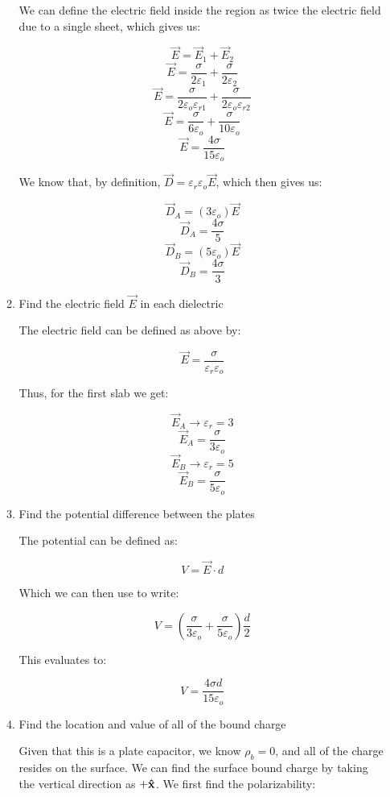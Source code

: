 \begin{enumerate}
\begin{enumerate}
        We can define the electric field inside the region as twice the electric field due to a single sheet, which gives us:

        $$\vec{E}=\vec{E}_1+\vec{E}_2$$
        $$\vec{E}=\frac{\sigma}{2\varepsilon_1}+\frac{\sigma}{2\varepsilon_2}$$
        $$\vec{E}=\frac{\sigma}{2\varepsilon_o\varepsilon_{r1}}+\frac{\sigma}{2\varepsilon_o\varepsilon_{r2}}$$
        $$\vec{E}=\frac{\sigma}{6\varepsilon_o}+\frac{\sigma}{10\varepsilon_o}$$
        $$\vec{E}=\frac{4\sigma}{15\varepsilon_o}$$

        We know that, by definition, $\vec{D}=\varepsilon_r\varepsilon_o\vec{E}$, which then gives us:

        $$\vec{D}_A=(3\varepsilon_o)\vec{E}$$
        $$\boxed{\vec{D}_A=\frac{4\sigma}{5}}$$
        $$\vec{D}_B=(5\varepsilon_o)\vec{E}$$
        $$\boxed{\vec{D}_B=\frac{4\sigma}{3}}$$

      \item Find the electric field $\vec{E}$ in each dielectric

        The electric field can be defined as above by:

        $$\vec{E}=\frac{\sigma}{\varepsilon_r\varepsilon_o}$$

        Thus, for the first slab we get:

        $$\vec{E}_A\to\varepsilon_r=3$$
        $$\boxed{\vec{E}_A=\frac{\sigma}{3\varepsilon_o}}$$
        $$\vec{E}_B\to\varepsilon_r=5$$
        $$\boxed{\vec{E}_B=\frac{\sigma}{5\varepsilon_o}}$$

      \item Find the potential difference between the plates

        The potential can be defined as:

        $$V=\vec{E}\cdot d$$

        Which we can then use to write:

        $$V=\left( \frac{\sigma}{3\varepsilon_o} +\frac{\sigma}{5\varepsilon_o}\right)\frac{d}{2}$$

        This evaluates to:

        $$\boxed{V=\frac{4\sigma d}{15\varepsilon_o}}$$

      \item Find the location and value of all of the bound charge

        Given that this is a plate capacitor, we know $\rho_b=0$, and all of the charge resides on the surface. We can find the surface bound charge by taking the vertical direction as $+\bold{\hat{x}}$. We first find the polarizability:


\end{enumerate}
\end{enumerate}
